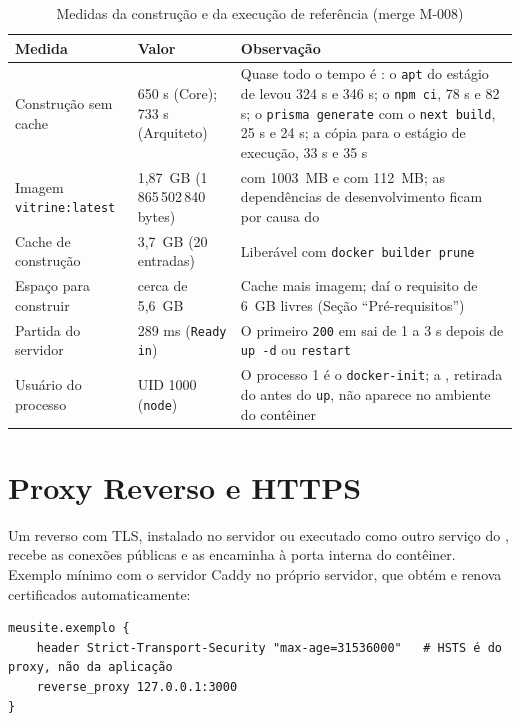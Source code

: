 \begin{table}[htb]
\caption{Medidas da construção e da execução de referência (merge M-008)}\label{tab:impl-medidas}
\small
\begin{tabularx}{\linewidth}{@{}L{3.7cm}L{3.5cm}Y@{}}
\toprule
\textbf{Medida} & \textbf{Valor} & \textbf{Observação}\\
\midrule
Construção sem cache & 650 s (Core); 733 s (Arquiteto) & Quase todo o tempo é : o \texttt{apt} do estágio de  levou 324 s e 346 s; o \texttt{npm ci}, 78 s e 82 s; o \texttt{prisma generate} com o \texttt{next build}, 25 s e 24 s; a cópia para o estágio de execução, 33 s e 35 s\\
\addlinespace
Imagem \texttt{vitrine:latest} & 1,87~GB (1\,865\,502\,840 bytes) &  com 1003~MB e  com 112~MB; as dependências de desenvolvimento ficam por causa do \\
\addlinespace
Cache de construção & 3,7~GB (20 entradas) & Liberável com \texttt{docker builder prune}\\
\addlinespace
Espaço para construir & cerca de 5,6~GB & Cache mais imagem; daí o requisito de 6~GB livres (Seção ``Pré-requisitos'')\\
\addlinespace
Partida do servidor & 289 ms (\texttt{Ready in}) & O primeiro \texttt{200} em  sai de 1 a 3 s depois de \texttt{up -d} ou \texttt{restart}\\
\addlinespace
Usuário do processo & UID 1000 (\texttt{node}) & O processo 1 é o \texttt{docker-init}; a , retirada do  antes do \texttt{up}, não aparece no ambiente do contêiner\\
\bottomrule
\end{tabularx}
\end{table}

\section{Proxy Reverso e HTTPS}\label{sec:proxy}

Um  reverso com TLS, instalado no servidor ou executado como outro serviço do , recebe as conexões públicas e as encaminha à porta interna do contêiner. Exemplo mínimo com o servidor Caddy no próprio servidor, que obtém e renova certificados automaticamente:

\begin{lstlisting}[caption={Esboço: Caddyfile para o Vitrine}, label={lst:caddy}]
meusite.exemplo {
    header Strict-Transport-Security "max-age=31536000"   # HSTS é do proxy, não da aplicação
    reverse_proxy 127.0.0.1:3000
}
\end{lstlisting}

